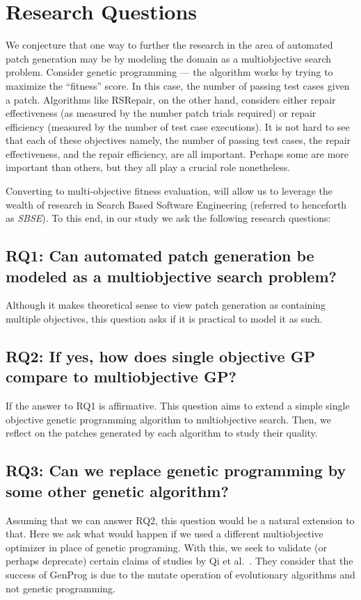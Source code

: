 \documentclass{sig-alternate}
\theoremstyle{break}
\begin{document}
\section{Research Questions}
\label{rq}
We conjecture that one way to further the research in the area of automated patch generation may be by modeling the domain as a multiobjective search problem. Consider genetic programming --- the algorithm works by trying to maximize the ``fitness'' score. In this case, the number of passing test cases given a patch. Algorithms like RSRepair, on the other hand, considers either repair effectiveness (as measured by the number patch trials required) or repair efficiency (measured by the number of test case executions). It is not hard to see that each of these objectives namely, the number of passing test cases, the repair effectiveness, and the repair efficiency, are all important. Perhaps some are more important than others, but they all play a crucial role nonetheless. 

Converting to multi-objective fitness evaluation, will allow us to leverage the wealth of research in Search Based Software Engineering (referred to henceforth as \textit{SBSE}). To this end, in our study we ask the following research questions:

\subsection*{RQ1: Can automated patch generation be modeled as a multiobjective search problem?}
\label{rq1}
Although it makes theoretical sense to view patch generation as containing multiple objectives, this question asks if it is practical to model it as such.

\subsection*{RQ2: If yes, how does single objective GP compare to multiobjective GP?}
\label{rq2}
If the answer to RQ1 is affirmative. This question aims to extend a simple single objective genetic programming algorithm to multiobjective search. Then, we reflect on the patches generated by each algorithm to study their quality.

\subsection*{RQ3: Can we replace genetic programming by some other genetic algorithm?}
\label{rq3}
Assuming that we can answer RQ2, this question would be a natural extension to that. Here we ask what would happen if we used a different multiobjective optimizer in place of genetic programing. With this, we seek to validate (or perhaps deprecate) certain claims of studies by Qi et al.~\cite{qi2014}. They consider that the success of GenProg is due to the mutate operation of evolutionary algorithms and not genetic programming. 
\end{document}
